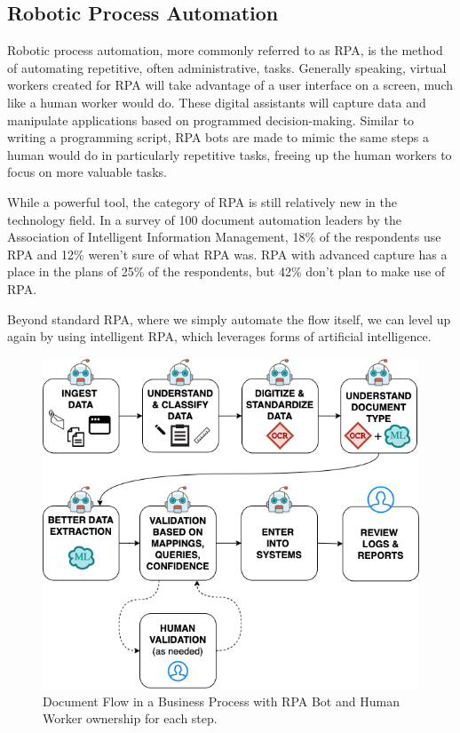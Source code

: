 \documentclass[conference]{IEEEtran}
\begin{document}
\subsection{Robotic Process Automation}
Robotic process automation, more commonly referred to as RPA, is the method of automating repetitive, often administrative, tasks. Generally speaking, virtual workers created for RPA will take advantage of a user interface on a screen, much like a human worker would do. These digital assistants will capture data and manipulate applications based on programmed decision-making. Similar to writing a programming script, RPA bots are made to mimic the same steps a human would do in particularly repetitive tasks, freeing up the human workers to focus on more valuable tasks.

While a powerful tool, the category of RPA is still relatively new in the technology field. In a survey of 100 document automation leaders by the Association of Intelligent Information Management, 18\% of the respondents use RPA and 12\% weren't sure of what RPA was. RPA with advanced capture has a place in the plans of 25\% of the respondents, but 42\% don't plan to make use of RPA. \cite{hollander2019survey}

Beyond standard RPA, where we simply automate the flow itself, we can level up again by using intelligent RPA, which leverages forms of artificial intelligence.

\begin{figure}[ht]
\centerline{\includegraphics[width=\columnwidth]{BotFlow.png}}
\caption{Document Flow in a Business Process with RPA Bot and Human Worker ownership for each step.}
\label{figBotFlow}
\end{figure}
\end{document}
